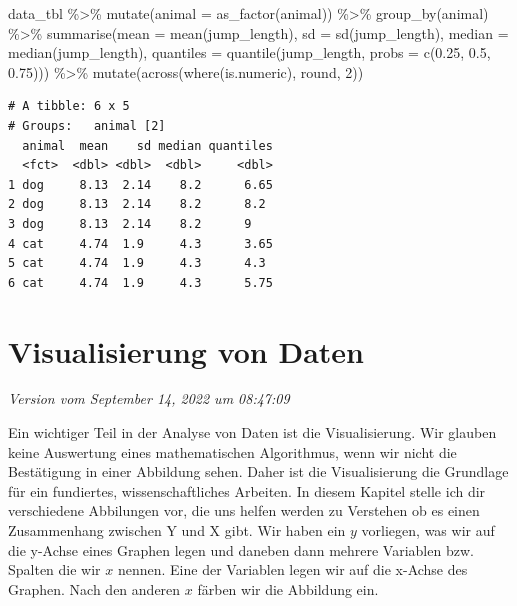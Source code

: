 \documentclass[
  letterpaper,
]{scrbook}
\newenvironment{Shaded}{\begin{snugshade}}{\end{snugshade}}
\newcommand{\AttributeTok}[1]{\textcolor[rgb]{0.40,0.45,0.13}{#1}}
\newcommand{\DecValTok}[1]{\textcolor[rgb]{0.68,0.00,0.00}{#1}}
\newcommand{\FloatTok}[1]{\textcolor[rgb]{0.68,0.00,0.00}{#1}}
\newcommand{\FunctionTok}[1]{\textcolor[rgb]{0.28,0.35,0.67}{#1}}
\newcommand{\NormalTok}[1]{\textcolor[rgb]{0.00,0.23,0.31}{#1}}
\newcommand{\SpecialCharTok}[1]{\textcolor[rgb]{0.37,0.37,0.37}{#1}}
\begin{document}
\begin{Shaded}
\begin{Highlighting}[]
\NormalTok{data\_tbl }\SpecialCharTok{\%\textgreater{}\%}
  \FunctionTok{mutate}\NormalTok{(}\AttributeTok{animal =} \FunctionTok{as\_factor}\NormalTok{(animal)) }\SpecialCharTok{\%\textgreater{}\%}
  \FunctionTok{group\_by}\NormalTok{(animal) }\SpecialCharTok{\%\textgreater{}\%}
  \FunctionTok{summarise}\NormalTok{(}\AttributeTok{mean =} \FunctionTok{mean}\NormalTok{(jump\_length),}
            \AttributeTok{sd =} \FunctionTok{sd}\NormalTok{(jump\_length),}
            \AttributeTok{median =} \FunctionTok{median}\NormalTok{(jump\_length),}
            \AttributeTok{quantiles =} \FunctionTok{quantile}\NormalTok{(jump\_length, }
                                 \AttributeTok{probs =} \FunctionTok{c}\NormalTok{(}\FloatTok{0.25}\NormalTok{, }\FloatTok{0.5}\NormalTok{, }\FloatTok{0.75}\NormalTok{))) }\SpecialCharTok{\%\textgreater{}\%} 
  \FunctionTok{mutate}\NormalTok{(}\FunctionTok{across}\NormalTok{(}\FunctionTok{where}\NormalTok{(is.numeric), round, }\DecValTok{2}\NormalTok{))}
\end{Highlighting}
\end{Shaded}

\begin{verbatim}
# A tibble: 6 x 5
# Groups:   animal [2]
  animal  mean    sd median quantiles
  <fct>  <dbl> <dbl>  <dbl>     <dbl>
1 dog     8.13  2.14    8.2      6.65
2 dog     8.13  2.14    8.2      8.2 
3 dog     8.13  2.14    8.2      9   
4 cat     4.74  1.9     4.3      3.65
5 cat     4.74  1.9     4.3      4.3 
6 cat     4.74  1.9     4.3      5.75
\end{verbatim}

\hypertarget{sec-eda-ggplot}{%
\chapter{Visualisierung von Daten}\label{sec-eda-ggplot}}

\emph{Version vom September 14, 2022 um 08:47:09}

{}

Ein wichtiger Teil in der Analyse von Daten ist die Visualisierung. Wir
glauben keine Auswertung eines mathematischen Algorithmus, wenn wir
nicht die Bestätigung in einer Abbildung sehen. Daher ist die
Visualisierung die Grundlage für ein fundiertes, wissenschaftliches
Arbeiten. In diesem Kapitel stelle ich dir verschiedene Abbilungen vor,
die uns helfen werden zu Verstehen ob es einen Zusammenhang zwischen Y
und X gibt. Wir haben ein \(y\) vorliegen, was wir auf die y-Achse eines
Graphen legen und daneben dann mehrere Variablen bzw. Spalten die wir
\(x\) nennen. Eine der Variablen legen wir auf die x-Achse des Graphen.
Nach den anderen \(x\) färben wir die Abbildung ein.
\end{document}
